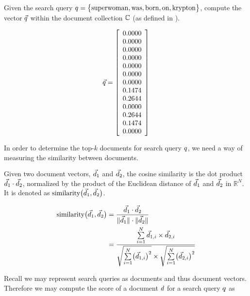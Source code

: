 		\begin{ex}
			Given the search query $q = \bigl\{\mathrm{superwoman}, \mathrm{was}, \mathrm{born}, \mathrm{on}, \mathrm{krypton}\bigr\}$, compute the vector $\vec{q}$ within the document collection $\mathbb{C}$ (as defined in ).
			
			\[
				\vec{q} = 
					\left[
						\begin{array}{c}
							0.0000 \\
							0.0000 \\
							0.0000 \\
							0.0000 \\
							0.0000 \\
							0.0000 \\
							0.0000 \\
							0.1474 \\
							0.2644 \\
							0.0000 \\
							0.2644 \\
							0.1474 \\
							0.0000 \\
						\end{array}
					\right]
			\]
		\end{ex}
		
		In order to determine the top-$k$ documents for search query $q$, we need a way of measuring the similarity between documents.
		
		\begin{defn}
			Given two document vectors, $\vec{d}_1$ and $\vec{d}_2$, the cosine similarity is the dot product $\vec{d}_1 \cdot \vec{d}_2$, normalized by the product of the Euclidean distance of $\vec{d}_1$ and $\vec{d}_2$ in $\mathbb{R}^N$.	It is denoted as $\operatorname{similarity}\bigl(\vec{d}_1, \vec{d}_2\bigr)$.
			
			\begin{align}
				\operatorname{similarity}\bigl(\vec{d}_1, \vec{d}_2\bigr) &= \frac{\vec{d}_1 \cdot \vec{d}_2}{\lVert\vec{d}_1\rVert \cdot \lVert\vec{d}_2\rVert} \\
				 &= \frac{\sum\limits_{i=1}^{N} \vec{d}_{1, i} \times \vec{d}_{2, i}}{\sqrt{\sum\limits_{i=1}^{N} \bigl(\vec{d}_{1, i}\bigr)^2} \times \sqrt{\sum\limits_{i=1}^{N} \bigl(\vec{d}_{2, i}\bigr)^2}}
			\end{align}
		\end{defn}
		
		Recall we may represent search queries as documents and thus document vectors.	Therefore we may compute the score of a document $d$ for a search query $q$ as
		
